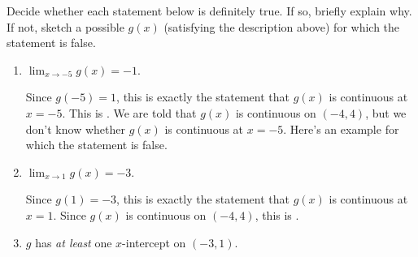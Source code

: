 \documentclass{article}
\theoremstyle{theorem}
\begin{document}
\begin{enumerate}
  Decide whether each statement below is definitely true. If so, briefly explain why. If not, sketch a possible $g(x)$ (satisfying the description above) for which the statement is false.

  \begin{enumerate}
  \item \label{fall2012-ma-midterm1-3-II-a}
    \begin{problem}[\vfill]
      $\displaystyle \lim_{x\to-5} g(x) = -1$.
    \end{problem}

    \begin{solution}
      Since $g(-5) = 1$, this is exactly the statement that $g(x)$ is continuous at $x=-5$. This is . We are told that $g(x)$ is continuous on $(-4, 4)$, but we don't know whether $g(x)$ is continuous at $x=-5$. Here's an example for which the statement is false.
      \begin{center}
      \end{center}
    \end{solution}

  \item
    \begin{problem}[\vfill\newpage]
      $\displaystyle \lim_{x\to 1} g(x)= -3$.
    \end{problem}

    \begin{solution}
      Since $g(1) = -3$, this is exactly the statement that $g(x)$ is
      continuous at $x=1$.  Since $g(x)$ is continuous on $(-4, 4)$, this
      is .
    \end{solution}

  \item
    \begin{problem}[\vfill]
      $g$ has {\it at least} one $x$-intercept on $(-3, 1)$.
    \end{problem}


\end{enumerate}
\end{enumerate}
\end{document}
